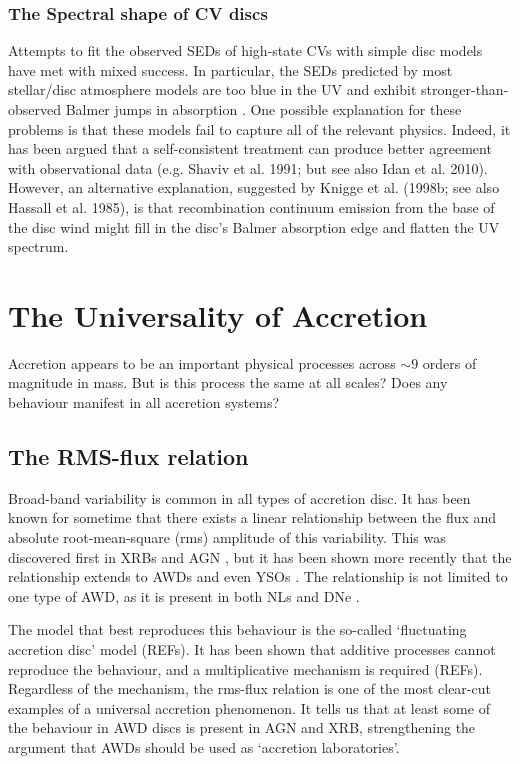 \subsubsection{The Spectral shape of CV discs}

Attempts to fit the observed SEDs of high-state CVs with simple disc models have met with mixed success. In
particular, the SEDs predicted by most stellar/disc atmosphere models 
are too blue in the UV \citep{wade1988,long1991,long1994,knigge1998} and exhibit
stronger-than-observed Balmer jumps in absorption 
\citep{wade1984,haug1987,ladous1989b,knigge1998}. One possible
explanation for these problems is that these models fail to capture
all of the relevant physics. Indeed, it has been argued that a
self-consistent treatment can produce better agreement with 
observational data (e.g. Shaviv et al. 1991;  but see also Idan et al. 2010).
\nocite{idanshaviv2010} \nocite{shaviv1991}
However, an alternative explanation, suggested by Knigge et al.
(1998b; see also Hassall et al. 1985)\nocite{KLWB98,hassall}, 
is that recombination continuum emission from the base of the 
disc wind might fill in the disc's Balmer absorption edge and flatten the UV spectrum.

\section{The Universality of Accretion}

Accretion appears to be an important physical processes across $\sim9$ orders
of magnitude in mass. But is this process the same at all scales? Does any 
behaviour manifest in all accretion systems? 

\subsection{The RMS-flux relation}

Broad-band variability is common in all types of accretion disc. It has been
known for sometime that there exists a linear relationship
between the flux and absolute root-mean-square (rms) amplitude
of this variability. This was discovered first in XRBs and AGN 
\citep{uttley2001, uttley2005, heil2012}, but it has been shown
more recently that the relationship extends to AWDs and even YSOs 
\citep{scaringi2012,scaringi2015a}. The relationship is not limited
to one type of AWD, as it is present in both NLs and DNe \citep{vandesande2015}.
 
The model that best reproduces this behaviour is the so-called
`fluctuating accretion disc' model (REFs). It has been shown that 
additive processes cannot reproduce the behaviour, and a multiplicative
mechanism is required (REFs). 
Regardless of the mechanism, the rms-flux relation is one of the most
clear-cut examples of a universal accretion phenomenon. 
It tells us that at least some of the behaviour in AWD discs
is present in AGN and XRB, strengthening the argument that AWDs
should be used as `accretion laboratories'. 


